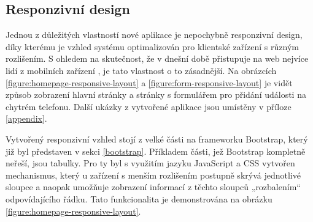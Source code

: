 \subsection{Responzivní design}
Jednou z důležitých vlastností nové aplikace je nepochybně responzivní design, díky kterému je vzhled systému optimalizován pro klientské zařízení s různým rozlišením. S ohledem na skutečnost, že v dnešní době přistupuje na web nejvíce lidí z mobilních zařízení \cite{deviceusage}, je tato vlastnost o to zásadnější. Na obrázcích \ref{figure:homepage-responsive-layout} a \ref{figure:form-responsive-layout} je vidět způsob zobrazení hlavní stránky a stránky s formulářem pro přidání události na chytrém telefonu. Další ukázky z vytvořené aplikace jsou umístěny v příloze \ref{appendix}.

Vytvořený responzivní vzhled stojí z velké části na frameworku Bootstrap, který již byl představen v sekci \ref{bootstrap}. Příkladem části, jež Bootstrap kompletně neřeší, jsou tabulky. Pro ty byl s využitím jazyku JavaScript a CSS vytvořen mechanismus, který u zařízení s menším rozlišením postupně skrývá jednotlivé sloupce a naopak umožňuje zobrazení informací z těchto sloupců „rozbalením“ odpovídajícího řádku. Tato funkcionalita je demonstrována na obrázku \ref{figure:homepage-responsive-layout}.

